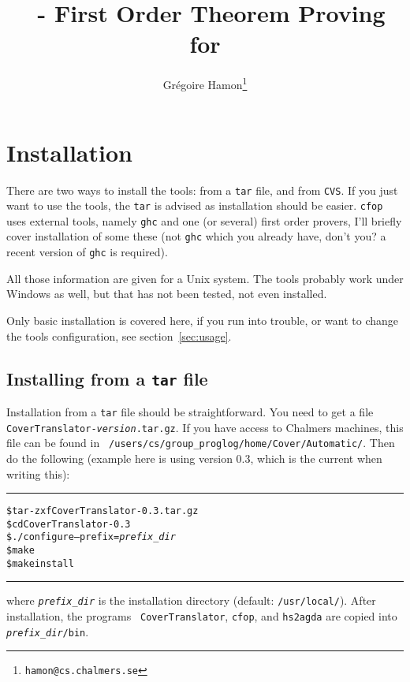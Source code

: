 \documentclass{article}
\title{\cfop\ - First Order Theorem Proving for \haskell}
\author{Gr\'egoire Hamon\footnote{\tt hamon@cs.chalmers.se}}
\newenvironment{shellcode}
  {\begin{alltt}\rule{7cm}{1pt}}
  {\rule{7cm}{1pt}\end{alltt}}
\begin{document}
\maketitle

\section{Installation}

There are two ways to install the tools: from a {\tt tar} file, and
from {\tt CVS}. If you just want to use the tools, the {\tt tar} is
advised as installation should be easier. {\tt cfop} uses external
tools, namely {\tt ghc} and one (or several) first order provers, I'll
briefly cover installation of some these (not {\tt ghc} which you
already have, don't you? a recent version of {\tt ghc} is
required). 

All those information are given for a {\sc Unix} system. The tools
probably work under {\sc Windows} as well, but that has not been
tested, not even installed.

Only basic installation is covered here, if you run into trouble, or
want to change the tools configuration, see section~\ref{sec:usage}.

\subsection{Installing from a {\tt tar} file}
\label{sec:from-tt-tar}
Installation from a {\tt tar} file should be straightforward. You need
to get a file {\tt CoverTranslator-{\it version}.tar.gz}. If you have
access to Chalmers machines, this file can be found in {\tt
/users/cs/group\_proglog/home/Cover/Automatic/}. Then do the following
(example here is using version 0.3, which is the current when writing
this):
\begin{shellcode}
\$ {\color{red}tar -zxf CoverTranslator-0.3.tar.gz}
\$ {\color{red}cd CoverTranslator-0.3}
\$ {\color{red}./configure --prefix={\color{blue}\textit{prefix\_dir}}}
\$ {\color{red}make}
\$ {\color{red}make install}
\end{shellcode} 
where {\tt\it\color{blue}prefix\_dir} is the installation directory
(default: {\tt /usr/local/}). After installation, the programs {\tt
CoverTranslator}, {\tt cfop}, and {\tt hs2agda} are copied into
{\tt{\it\color{blue}prefix\_dir}/bin}.
\end{document}
